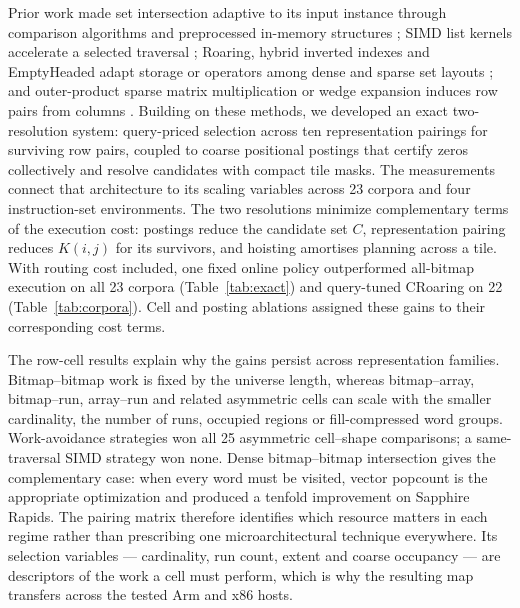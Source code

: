 Prior work made set intersection adaptive to its input instance through comparison algorithms and
preprocessed in-memory structures
\cite{demaine2000adaptive,ding2011intersection}; SIMD list kernels accelerate a selected traversal
\cite{inoue2014simdintersection,lemire2016simdintersection}; Roaring, hybrid inverted indexes and
EmptyHeaded adapt storage or operators among dense and sparse set layouts
\cite{culpepper2010intersection,chambi2016roaring,aberger2017emptyheaded}; and outer-product sparse
matrix multiplication or wedge expansion induces row pairs from columns
\cite{gustavson1978spgemm,buluc2011combinatorialblas,an2019skipintersection}. Building on these
methods, we developed an exact two-resolution system: query-priced selection across ten
representation pairings for surviving row pairs, coupled to coarse positional postings that certify
zeros collectively and resolve candidates with compact tile masks. The measurements connect that
architecture to its scaling variables across 23 corpora and four instruction-set environments.
The two resolutions minimize complementary terms of the execution cost: postings reduce the
candidate set $C$, representation pairing reduces $K(i,j)$ for its survivors, and hoisting amortises
planning across a tile. With routing cost included, one fixed online policy outperformed all-bitmap
execution on all 23 corpora (Table~\ref{tab:exact}) and query-tuned CRoaring on 22
(Table~\ref{tab:corpora}). Cell and posting ablations assigned these gains to their corresponding
cost terms.

The row-cell results explain why the gains persist across representation families. Bitmap--bitmap
work is fixed by the universe length, whereas bitmap--array, bitmap--run, array--run and related
asymmetric cells can scale with the smaller cardinality, the number of runs, occupied regions or
fill-compressed word groups. Work-avoidance strategies won all 25 asymmetric cell--shape comparisons; a
same-traversal SIMD strategy won none. Dense bitmap--bitmap intersection gives the complementary
case: when every word must be visited, vector popcount is the appropriate optimization and produced
a tenfold improvement on Sapphire Rapids. The pairing matrix therefore identifies which resource
matters in each regime rather than prescribing one microarchitectural technique everywhere. Its
selection variables --- cardinality, run count, extent and coarse occupancy --- are descriptors of
the work a cell must perform, which is why the resulting map transfers across the tested Arm and x86
hosts.

